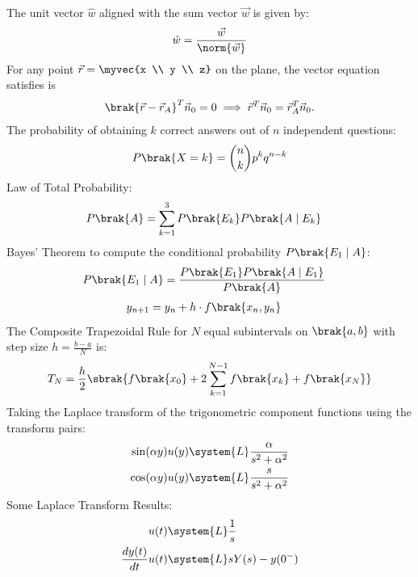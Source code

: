 \begin{enumerate}[label=\thesubsection.\arabic*, ref=\thesubsection.\theenumi]
	The unit vector $\hat{w}$ aligned with the sum vector $\vec{w}$ is given by:
	\begin{align}
		\hat{w} = \frac{\vec{w}}{\norm{\vec{w}}} \label{unit_vector}
	\end{align} 
	For any point $\vec{r} = \myvec{x \\ y \\ z}$ on the plane, the vector equation satisfies is
	\begin{align} 
	\brak{\vec{r} - \vec{r}_A}^T \vec{n}_0 = 0 \implies \vec{r}^T \vec{n}_0 = \vec{r}_A^T \vec{n}_0.\label{eq:plane}
	\end{align}
		The probability of obtaining $k$ correct answers out of $n$ independent questions:
	\begin{align}
		P\brak{X = k} = \binom{n}{k} p^k q^{n - k} 
		\label{eq:EE26BTECH11202-pmf}
		\end{align}
			Law of Total Probability:
		\begin{align}
			P\brak{A} &= \sum_{k=1}^{3} P\brak{E_k} P\brak{A \mid E_k} \label{tot_prop}
			\end{align} 
			Bayes' Theorem to compute the conditional probability $P\brak{E_1 \mid A}$:
			\begin{align}
				P\brak{E_1 \mid A} &= \frac{P\brak{E_1} P\brak{A \mid E_1}}{P\brak{A}} \label{bayer}
				\end{align} 
				\begin{align}
					y_{n+1} &= y_n + h \cdot f\brak{x_n, y_n}\label{euler_met}
				\end{align}
		The Composite Trapezoidal Rule for $N$ equal subintervals on $\brak{a, b}$ with step size $h = \frac{b - a}{N}$ is:
		\begin{align}
			T_N = \frac{h}{2} \sbrak{f\brak{x_0} + 2 \sum_{k=1}^{N-1} f\brak{x_k} + f\brak{x_N}}
			\label{eq:trap_formula}
		\end{align}
		Taking the Laplace transform of the trigonometric component functions using the transform pairs:
		\begin{align}
			\sin(\alpha y) u(y) &\system{L} \frac{\alpha}{s^2 + \alpha^2} \label{eq:laplace_sin} \\
			\cos(\alpha y) u(y) &\system{L} \frac{s}{s^2 + \alpha^2} \label{eq:laplace_cos}
		\end{align}
	Some Laplace Transform Results:
		\begin{align}
			u(t) &\system{L} \frac{1}{s} \\
			\frac{dy(t)}{dt} u(t) &\system{L} s Y(s) - y(0^-)\\

\end{align}
\end{enumerate}

